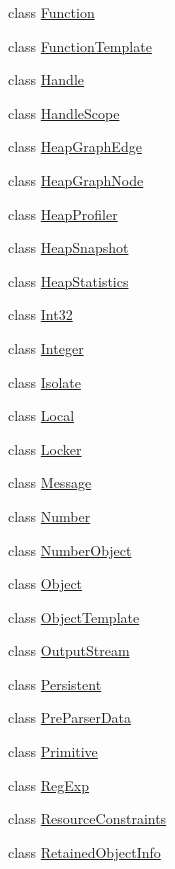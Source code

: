 \begin{DoxyCompactItemize}
\item 
class \hyperlink{classv8_1_1_function}{Function}
\item 
class \hyperlink{classv8_1_1_function_template}{Function\+Template}
\item 
class \hyperlink{classv8_1_1_handle}{Handle}
\item 
class \hyperlink{classv8_1_1_handle_scope}{Handle\+Scope}
\item 
class \hyperlink{classv8_1_1_heap_graph_edge}{Heap\+Graph\+Edge}
\item 
class \hyperlink{classv8_1_1_heap_graph_node}{Heap\+Graph\+Node}
\item 
class \hyperlink{classv8_1_1_heap_profiler}{Heap\+Profiler}
\item 
class \hyperlink{classv8_1_1_heap_snapshot}{Heap\+Snapshot}
\item 
class \hyperlink{classv8_1_1_heap_statistics}{Heap\+Statistics}
\item 
class \hyperlink{classv8_1_1_int32}{Int32}
\item 
class \hyperlink{classv8_1_1_integer}{Integer}
\item 
class \hyperlink{classv8_1_1_isolate}{Isolate}
\item 
class \hyperlink{classv8_1_1_local}{Local}
\item 
class \hyperlink{classv8_1_1_locker}{Locker}
\item 
class \hyperlink{classv8_1_1_message}{Message}
\item 
class \hyperlink{classv8_1_1_number}{Number}
\item 
class \hyperlink{classv8_1_1_number_object}{Number\+Object}
\item 
class \hyperlink{classv8_1_1_object}{Object}
\item 
class \hyperlink{classv8_1_1_object_template}{Object\+Template}
\item 
class \hyperlink{classv8_1_1_output_stream}{Output\+Stream}
\item 
class \hyperlink{classv8_1_1_persistent}{Persistent}
\item 
class \hyperlink{classv8_1_1_pre_parser_data}{Pre\+Parser\+Data}
\item 
class \hyperlink{classv8_1_1_primitive}{Primitive}
\item 
class \hyperlink{classv8_1_1_reg_exp}{Reg\+Exp}
\item 
class \hyperlink{classv8_1_1_resource_constraints}{Resource\+Constraints}
\item 
class \hyperlink{classv8_1_1_retained_object_info}{Retained\+Object\+Info}

\end{DoxyCompactItemize}
